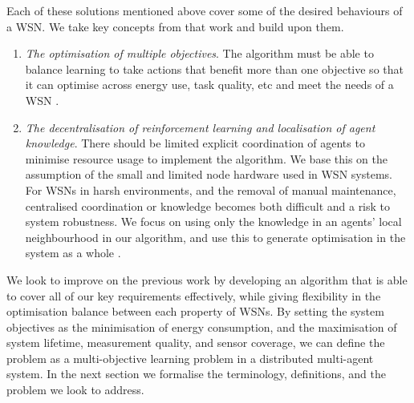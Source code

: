 Each of these solutions mentioned above cover some of the desired behaviours of a WSN. We take key concepts from that work and build upon them.

\begin{enumerate}
	\item \textit{The optimisation of multiple objectives}.  The algorithm must be able to balance learning to take actions that benefit more than one objective so that it can optimise across energy use, task quality, etc and meet the needs of a WSN \cite{Guo2019, s150717572, SENGUPTA2013405}.
	\item \textit{The decentralisation of reinforcement learning and localisation of agent knowledge}. There should be limited explicit coordination of agents to minimise resource usage to implement the algorithm. We base this on the assumption of the small and limited node hardware used in WSN systems. For WSNs in harsh environments, and the removal of manual maintenance, centralised coordination or knowledge becomes both difficult and a risk to system robustness. We focus on using only the knowledge in an agents' local neighbourhood in our algorithm, and use this to generate optimisation in the system as a whole  \citep{10.1007/978-3-642-11814-2_4}.
\end{enumerate}

We look to improve on the previous work by developing an algorithm that is able to cover all of our key requirements effectively, while giving flexibility in the optimisation balance between each property of WSNs. By setting the system objectives as the minimisation of energy consumption, and the maximisation of system lifetime, measurement quality, and sensor coverage, we can define the problem as a multi-objective learning problem in a distributed multi-agent system. In the next section we formalise the terminology, definitions, and the problem we look to address.


